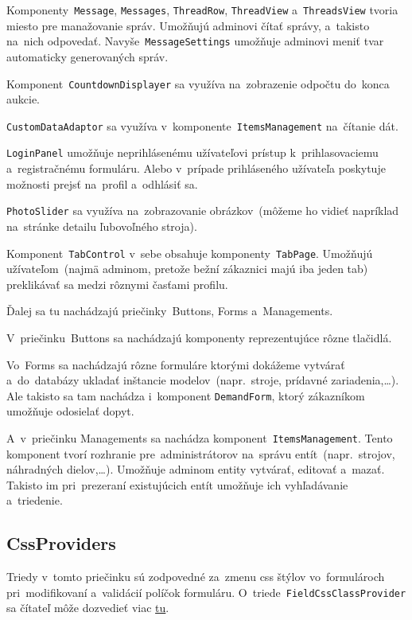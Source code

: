 Komponenty~\verb|Message|, \verb|Messages|, \verb|ThreadRow|, \verb|ThreadView| a~\verb|ThreadsView| tvoria miesto pre manažovanie správ. Umožňujú adminovi čítať správy, a~takisto na~nich odpovedať. Navyše~\verb|MessageSettings| umožňuje adminovi meniť tvar automaticky generovaných správ.

Komponent~\verb|CountdownDisplayer| sa využíva na~zobrazenie odpočtu do~konca aukcie.

\verb|CustomDataAdaptor| sa využíva v~komponente~\verb|ItemsManagement| na~čítanie dát.

\verb|LoginPanel| umožňuje neprihlásenému užívateľovi prístup k~prihlasovaciemu a~registračnému formuláru. Alebo v~prípade prihláseného užívateľa poskytuje možnosti prejsť na~profil a~odhlásiť sa.

\verb|PhotoSlider| sa využíva na~zobrazovanie obrázkov~(môžeme ho vidieť napríklad na~stránke detailu ľubovoľného stroja).

Komponent~\verb|TabControl| v~sebe obsahuje komponenty~\verb|TabPage|. Umožňujú užívateľom~(najmä adminom, pretože bežní zákaznici majú iba jeden tab) preklikávať sa medzi rôznymi časťami profilu.

Ďalej sa tu nachádzajú priečinky~Buttons, Forms a~Managements.

V~priečinku~Buttons sa nachádzajú komponenty reprezentujúce rôzne tlačidlá.

Vo~Forms sa nachádzajú rôzne formuláre ktorými dokážeme vytvárať a~do~databázy ukladať inštancie modelov~(napr.~stroje, prídavné zariadenia,\dots). Ale takisto sa tam nachádza i~komponent \verb|DemandForm|, ktorý zákazníkom umožňuje odosielať dopyt.

A~v~priečinku Managements sa nachádza komponent~\verb|ItemsManagement|. Tento komponent tvorí rozhranie pre~administrátorov na~správu entít~(napr.~strojov, náhradných dielov,\dots). Umožňuje adminom entity vytvárať, editovať a~mazať. Takisto im pri~prezeraní existujúcich entít umožňuje ich vyhľadávanie a~triedenie.

\subsection{CssProviders}

Triedy v~tomto priečinku sú zodpovedné za~zmenu css štýlov vo~formulároch pri~modifikovaní a~validácií políčok formuláru. O~triede~\verb|FieldCssClassProvider| sa čítateľ môže dozvedieť viac \href{https://learn.microsoft.com/en-us/dotnet/api/microsoft.aspnetcore.components.forms.fieldcssclassprovider?view=aspnetcore-7.0}{tu}.

